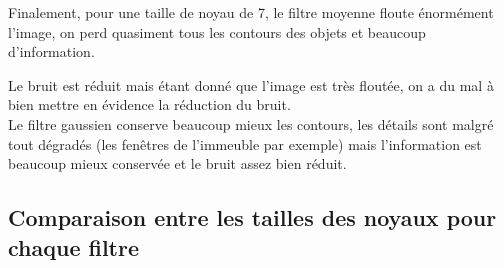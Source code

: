 \documentclass{article}
\begin{document}
\begin{enumerate}[label=\arabic*$\degres$)]
Finalement, pour une taille de noyau de 7, le filtre moyenne floute énormément l'image, on perd quasiment tous les contours des objets et beaucoup d'information. 

Le bruit est réduit mais étant donné que l'image est très floutée, on a du mal à bien mettre en évidence la réduction du bruit.\\

Le filtre gaussien conserve beaucoup mieux les contours, les détails sont malgré tout dégradés (les fenêtres de l'immeuble par exemple) mais l'information est beaucoup mieux conservée et le bruit assez bien réduit.

\subsection*{Comparaison entre les tailles des noyaux pour chaque filtre}



\end{enumerate}
\end{document}
